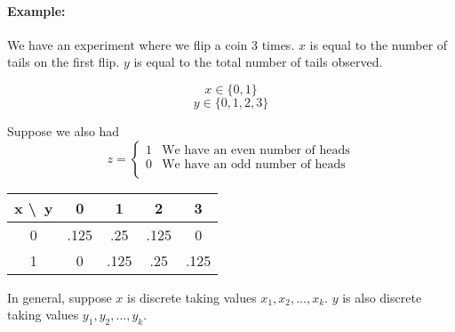 \documentclass[letterpaper,12pt]{article}
\begin{document}
\paragraph{Example:} We have an experiment where we flip a coin 3 times. $x$ is equal to the number of tails
on the first flip. $y$ is equal to the total number of tails observed.

$$x \in \{0,1\}$$
$$y \in \{0,1,2,3\}$$


Suppose we also had 
$$z = \begin{cases}
        1 & \text{We have an even number of heads}\\
        0 & \text{We have an odd number of heads}\\
    \end{cases}
$$


\begin{center}
\begin{tabular}{|| c || c | c | c | c ||} 
 \hline
 \hline
 x \textbackslash \, y & 0 & 1 & 2 & 3\\ [0.5ex] 

 \hline\hline
 0  & .125 & .25 & .125 & 0 \\ 
 \hline
1 & 0 & .125 & .25 & .125 \\
 \hline
 \hline
\end{tabular}
\end{center}


In general, suppose $x$ is discrete taking values $x_1, x_2, \ldots, x_k$. $y$ is also discrete
taking values $y_1, y_2, \ldots, y_k$.
\end{document}

